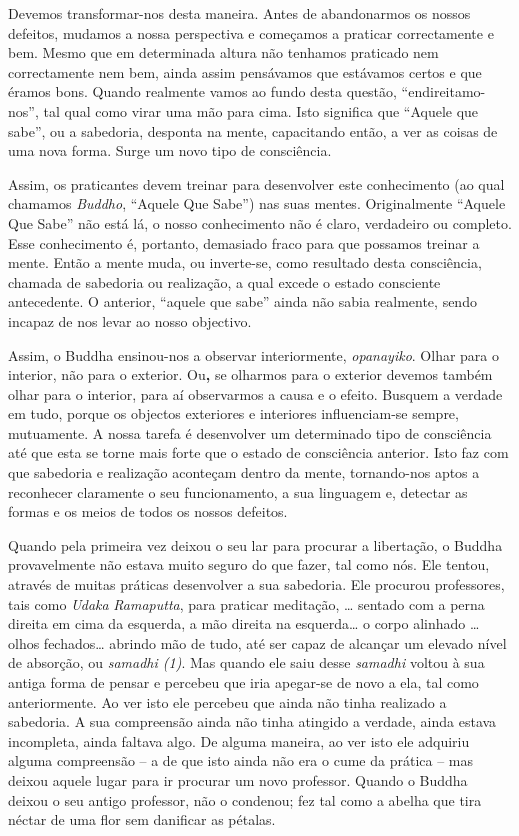 Devemos transformar-nos desta maneira. Antes de abandonarmos os nossos
defeitos, mudamos a nossa perspectiva e começamos a praticar
correctamente e bem. Mesmo que em determinada altura não tenhamos
praticado nem correctamente nem bem, ainda assim pensávamos que
estávamos certos e que éramos bons. Quando realmente vamos ao fundo
desta questão, ``endireitamo-nos'', tal qual como virar uma mão para
cima. Isto significa que ``Aquele que sabe'', ou a sabedoria, desponta
na mente, capacitando então, a ver as coisas de uma nova forma. Surge um
novo tipo de consciência.

Assim, os praticantes devem treinar para desenvolver este conhecimento
(ao qual chamamos \emph{Buddho}, ``Aquele Que Sabe'') nas suas mentes.
Originalmente ``Aquele Que Sabe'' não está lá, o nosso conhecimento não
é claro, verdadeiro ou completo. Esse conhecimento é, portanto,
demasiado fraco para que possamos treinar a mente. Então a mente muda,
ou inverte-se, como resultado desta consciência, chamada de sabedoria ou
realização, a qual excede o estado consciente antecedente. O anterior,
``aquele que sabe'' ainda não sabia realmente, sendo incapaz de nos
levar ao nosso objectivo.

Assim, o Buddha ensinou-nos a observar interiormente, \emph{opanayiko}.
Olhar para o interior, não para o exterior. Ou\textbf{,} se olharmos
para o exterior devemos também olhar para o interior, para aí
observarmos a causa e o efeito. Busquem a verdade em tudo, porque os
objectos exteriores e interiores influenciam-se sempre, mutuamente. A
nossa tarefa é desenvolver um determinado tipo de consciência até que
esta se torne mais forte que o estado de consciência anterior. Isto faz
com que sabedoria e realização aconteçam dentro da mente, tornando-nos
aptos a reconhecer claramente o seu funcionamento, a sua linguagem e,
detectar as formas e os meios de todos os nossos defeitos.

Quando pela primeira vez deixou o seu lar para procurar a libertação, o
Buddha provavelmente não estava muito seguro do que fazer, tal como nós.
Ele tentou, através de muitas práticas desenvolver a sua sabedoria. Ele
procurou professores, tais como \emph{Udaka} \emph{Ramaputta}, para
praticar meditação, \ldots{} sentado com a perna direita em cima da
esquerda, a mão direita na esquerda\ldots{} o corpo alinhado \ldots{}
olhos fechados\ldots{} abrindo mão de tudo, até ser capaz de alcançar um
elevado nível de absorção, ou \emph{samadhi (1)}. Mas quando ele saiu
desse \emph{samadhi} voltou à sua antiga forma de pensar e percebeu que
iria apegar-se de novo a ela, tal como anteriormente. Ao ver isto ele
percebeu que ainda não tinha realizado a sabedoria. A sua compreensão
ainda não tinha atingido a verdade, ainda estava incompleta, ainda
faltava algo. De alguma maneira, ao ver isto ele adquiriu alguma
compreensão -- a de que isto ainda não era o cume da prática -- mas
deixou aquele lugar para ir procurar um novo professor. Quando o Buddha
deixou o seu antigo professor, não o condenou; fez tal como a abelha que
tira néctar de uma flor sem danificar as pétalas.

